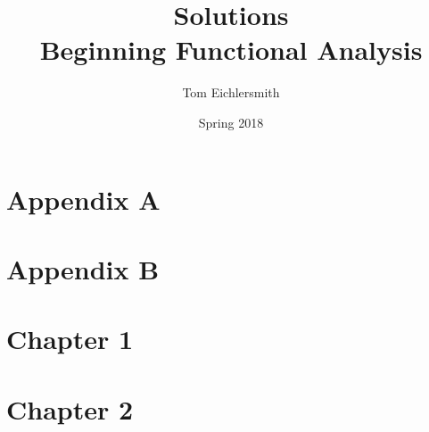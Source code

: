 \documentclass{article}
\title{Solutions \\ Beginning Functional Analysis}
\author{Tom Eichlersmith}
\date{Spring 2018}
\begin{document}
 
\maketitle
 
\section*{Appendix A}
 


\section*{Appendix B}



\section*{Chapter 1}



\section*{Chapter 2}


 
\end{document}
